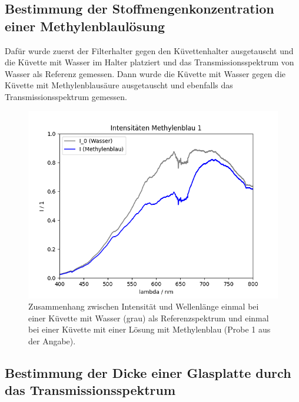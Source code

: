 \documentclass{article}
\begin{document}
\subsection{Bestimmung der Stoffmengenkonzentration einer Methylenblaulösung}

Dafür wurde zuerst der Filterhalter gegen den Küvettenhalter ausgetauscht und die Küvette mit Wasser im Halter platziert und das Transmissionsspektrum von Wasser als Referenz gemessen. Dann wurde die Küvette mit Wasser gegen die Küvette mit Methylenblausäure ausgetauscht und ebenfalls das Transmissionsspektrum gemessen.



\begin{figure}[H]
\centering
\caption{Zusammenhang zwischen Intensität und Wellenlänge einmal bei einer Küvette mit Wasser (grau) als Referenzspektrum und einmal bei einer Küvette mit einer Lösung mit Methylenblau (Probe 1 aus der Angabe).}
\label{fig:I_methylenblau1}
\includegraphics[scale=0.6]{MB_Intensitaeten_1.png}
\end{figure}






\subsection{Bestimmung der Dicke einer Glasplatte durch das Transmissionsspektrum}
\end{document}
